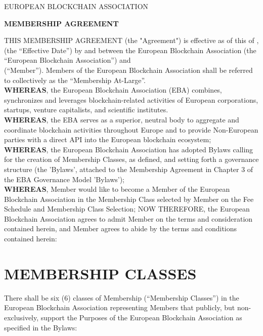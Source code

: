 \documentclass{article}
\begin{document}
{\scshape\LARGE EUROPEAN BLOCKCHAIN ASSOCIATION \centering \par}
\vspace{0.4cm}
{\huge\bfseries MEMBERSHIP AGREEMENT \centering \par}
\vspace{0.8cm}


THIS MEMBERSHIP AGREEMENT (the "Agreement") is effective as of this  of ,  (the “Effective Date”) by and between the European Blockchain Association (the “European Blockchain Association”) and \\  (“Member”). Members of the European Blockchain Association shall be referred to collectively as the “Membership At-Large”. \\
\textbf{WHEREAS}, the European Blockchain Association (EBA) combines, synchronizes and leverages blockchain-related activities of European corporations, startups, venture capitalists, and scientific institutes.\\
\textbf{WHEREAS}, the EBA serves as a superior, neutral body to aggregate and coordinate blockchain activities throughout Europe and to provide Non-European parties with a direct API into the European blockchain ecosystem;\\
\textbf{WHEREAS}, the European Blockchain Association has adopted Bylaws calling for the creation of Membership Classes, as defined, and setting forth a governance structure (the 'Bylaws', attached to the Membership Agreement in Chapter 3 of the EBA Governance Model 'Bylaws');\\
\textbf{WHEREAS}, Member would like to become a Member of the European Blockchain Association in the Membership Class selected by Member on the Fee Schedule and Membership Class Selection;
NOW THEREFORE, the European Blockchain Association agrees to admit Member on the terms and consideration contained herein, and Member agrees to abide by the terms and conditions contained herein:

\section{MEMBERSHIP CLASSES}
	There shall be six (6) classes of Membership (“Membership Classes”) in the European Blockchain Association representing Members that publicly, but non-exclusively, support the Purposes of the European Blockchain Association as specified in the Bylaws:
	
\end{document}
